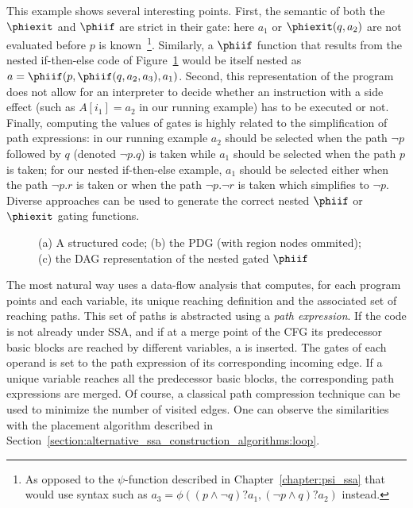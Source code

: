 This example shows several interesting points. 
First, the semantic of both the $\phiexit$ and $\phiif$ are strict in their gate: 
here $a_1$ or $\phiexit(q,a_2)$ are not evaluated before $p$ is known~\footnote{As opposed to the $\psi$-function described in Chapter~\ref{chapter:psi_ssa} that would use syntax such as $a_3=\phi((p\wedge \lnot q)?a_1, (\lnot p\wedge q)?a_2)$ instead.}. 
Similarly, a $\phiif$ function that results from the nested if-then-else code of Figure~\ref{fig:vsdg:structured} would be itself nested as $a=\phiif(p,\phiif(q,a_2,a_3),a_1)$. 
Second, this representation of the program does not allow for an interpreter to decide whether an instruction with a side effect (such as $A[i_1]=a_2$ in our running example) has to be executed or not. 
Finally, computing the values of gates is highly related to the simplification of path expressions: 
in our running example $a_2$ should be selected when the path $\lnot p$ followed by $q$ (denoted $\lnot p . 
q$) is taken while $a_1$ should be selected when the path $p$ is taken; 
for our nested if-then-else example, $a_1$ should be selected either when the path $\lnot p . 
r$ is taken or when the path $\lnot p . 
\lnot r$ is taken which simplifies to $\lnot p$. 
Diverse approaches can be used to generate the correct nested $\phiif$ or $\phiexit$ gating functions.

\begin{figure}
\caption{(a) A structured code; (b) the PDG (with region nodes ommited); (c) the DAG representation of the nested gated $\phiif$ \label{fig:vsdg:structured}}
\end{figure}

The most natural way uses a data-flow analysis that computes, for each program points and each variable, its unique reaching definition and the associated set of reaching paths. 
This set of paths is abstracted using a \emph{path expression}. 
If the code is not already under SSA, and if at a merge point of the CFG its predecessor basic blocks are reached by different variables, a \phifun is inserted. 
The gates of each operand is set to the path expression of its corresponding incoming edge. 
If a unique variable reaches all the predecessor basic blocks, the corresponding path expressions are merged. 
Of course, a classical path compression technique can be used to minimize the number of visited edges. 
One can observe the similarities with the \phifun placement algorithm described in Section~\ref{section:alternative_ssa_construction_algorithms:loop}.

